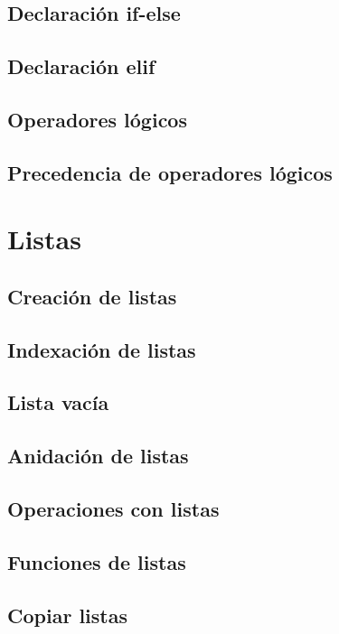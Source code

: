 \documentclass{report}
\begin{document}
\section{Declaración if-else}

\section{Declaración elif}

\section{Operadores lógicos}

\section{Precedencia de operadores lógicos}

\clearpage\chapter{Listas}

\section{Creación de listas}

\section{Indexación de listas}

\section{Lista vacía}

\section{Anidación de listas}

\section{Operaciones con listas}

\section{Funciones de listas}

\section{Copiar listas}
\end{document}
